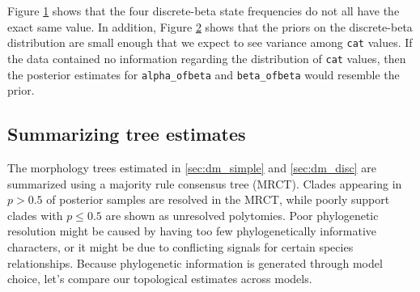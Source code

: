 \begin{figure}[h!]
\label{fig:tracer_cats}
\end{figure}

\begin{figure}[h!]
\label{fig:tracer_alpha_beta}
\end{figure}

Figure \ref{fig:tracer_cats} shows that the four discrete-beta state frequencies do not all have the exact same value.
In addition, Figure \ref{fig:tracer_alpha_beta} shows that the priors on the discrete-beta distribution are small enough that we expect to see variance among {\tt cat} values.
If the data contained no information regarding the distribution of {\tt cat} values, then the posterior estimates for {\tt alpha\_ofbeta} and {\tt beta\_ofbeta} would resemble the prior.

\subsection{Summarizing tree estimates}

\begin{figure}[h!]
\label{fig:simple_majrule}
\end{figure}


The morphology trees estimated in \ref{sec:dm_simple} and \ref{sec:dm_disc} are summarized using a majority rule consensus tree (MRCT).
Clades appearing in $p>0.5$ of posterior samples are resolved in the MRCT, while poorly support clades with $p \leq 0.5$ are shown as unresolved polytomies.
Poor phylogenetic resolution might be caused by having too few phylogenetically informative characters, or it might be due to conflicting signals for certain species relationships.
Because phylogenetic information is generated through model choice, let's compare our topological estimates across models.

